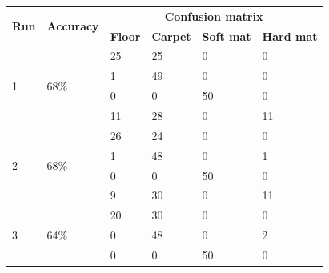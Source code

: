 \documentclass[USenglish]{ifimaster}  %
\begin{document}
\begin{table}[h]
	\centering
	\begin{tabular}{@{}llllll@{}}
		\toprule
		\multirow{2}{*}{\textbf{Run}} & \multirow{2}{*}{\textbf{Accuracy}} & \multicolumn{4}{c}{\textbf{Confusion matrix}} \\ \cmidrule(l){3-6} 
		&  & \multicolumn{1}{l|}{\textbf{Floor}} & \multicolumn{1}{l|}{\textbf{Carpet}} & \multicolumn{1}{l|}{\textbf{Soft mat}} & \textbf{Hard mat} \\ \midrule
		\multicolumn{1}{l|}{\multirow{4}{*}{1}} & \multicolumn{1}{l|}{\multirow{4}{*}{68\%}} & \multicolumn{1}{l|}{25} & \multicolumn{1}{l|}{25} & \multicolumn{1}{l|}{0} & 0 \\ \cmidrule(l){3-6} 
		\multicolumn{1}{l|}{} & \multicolumn{1}{l|}{} & \multicolumn{1}{l|}{1} & \multicolumn{1}{l|}{49} & \multicolumn{1}{l|}{0} & 0 \\ \cmidrule(l){3-6} 
		\multicolumn{1}{l|}{} & \multicolumn{1}{l|}{} & \multicolumn{1}{l|}{0} & \multicolumn{1}{l|}{0} & \multicolumn{1}{l|}{50} & 0 \\ \cmidrule(l){3-6} 
		\multicolumn{1}{l|}{} & \multicolumn{1}{l|}{} & \multicolumn{1}{l|}{11} & \multicolumn{1}{l|}{28} & \multicolumn{1}{l|}{0} & 11 \\ \midrule
		\multicolumn{1}{l|}{\multirow{4}{*}{2}} & \multicolumn{1}{l|}{\multirow{4}{*}{68\%}} & \multicolumn{1}{l|}{26} & \multicolumn{1}{l|}{24} & \multicolumn{1}{l|}{0} & 0 \\ \cmidrule(l){3-6} 
		\multicolumn{1}{l|}{} & \multicolumn{1}{l|}{} & \multicolumn{1}{l|}{1} & \multicolumn{1}{l|}{48} & \multicolumn{1}{l|}{0} & 1 \\ \cmidrule(l){3-6} 
		\multicolumn{1}{l|}{} & \multicolumn{1}{l|}{} & \multicolumn{1}{l|}{0} & \multicolumn{1}{l|}{0} & \multicolumn{1}{l|}{50} & 0 \\ \cmidrule(l){3-6} 
		\multicolumn{1}{l|}{} & \multicolumn{1}{l|}{} & \multicolumn{1}{l|}{9} & \multicolumn{1}{l|}{30} & \multicolumn{1}{l|}{0} & 11 \\ \midrule
		\multicolumn{1}{l|}{\multirow{4}{*}{3}} & \multicolumn{1}{l|}{\multirow{4}{*}{64\%}} & \multicolumn{1}{l|}{20} & \multicolumn{1}{l|}{30} & \multicolumn{1}{l|}{0} & 0 \\ \cmidrule(l){3-6} 
		\multicolumn{1}{l|}{} & \multicolumn{1}{l|}{} & \multicolumn{1}{l|}{0} & \multicolumn{1}{l|}{48} & \multicolumn{1}{l|}{0} & 2 \\ \cmidrule(l){3-6} 
		\multicolumn{1}{l|}{} & \multicolumn{1}{l|}{} & \multicolumn{1}{l|}{0} & \multicolumn{1}{l|}{0} & \multicolumn{1}{l|}{50} & 0 \\ \cmidrule(l){3-6} 

\end{tabular}
\end{table}
\end{document}
